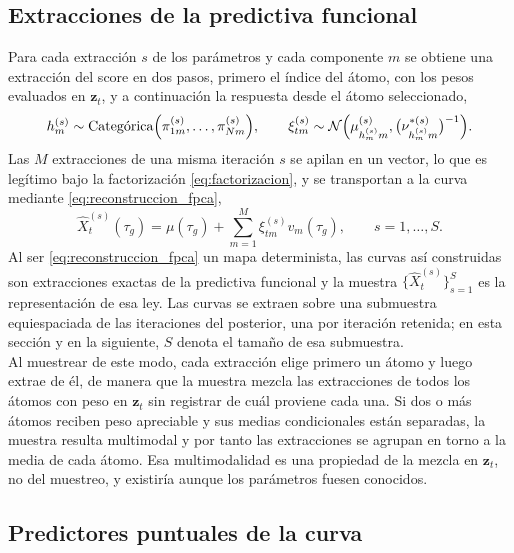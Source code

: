 \subsection{Extracciones de la predictiva funcional}
\label{03_05_03_extracciones}

Para cada extracción $s$ de los parámetros y cada componente $m$ se obtiene una extracción del score en dos pasos, primero el índice del átomo, con los pesos evaluados en $\mathbf{z}_t$, y a continuación la respuesta desde el átomo seleccionado,
\begin{equation}\label{eq:extraccion_score}
    h_m^{(s)} \sim \text{Categórica}\Bigl(\pi_{1m}^{(s)}, \dots, \pi_{Nm}^{(s)}\Bigr),
    \qquad
    \xi_{tm}^{(s)} \sim \mathcal{N}\Bigl(\mu_{h_m^{(s)}m}^{(s)},
    \bigl(\nu_{h_m^{(s)}m}^{*(s)}\bigr)^{-1}\Bigr).
\end{equation}
Las $M$ extracciones de una misma iteración $s$ se apilan en un vector, lo que es legítimo bajo la factorización \eqref{eq:factorizacion}, y se transportan a la curva mediante \eqref{eq:reconstruccion_fpca},
\begin{equation}\label{eq:extraccion_curva}
    \widehat{X}_{t}^{(s)}(\tau_g) = \mu(\tau_g)
    + \sum_{m=1}^{M} \xi_{tm}^{(s)}v_m(\tau_g),
    \qquad s = 1, \dots, S.
\end{equation}
Al ser \eqref{eq:reconstruccion_fpca} un mapa determinista, las curvas así construidas son extracciones exactas de la predictiva funcional y la muestra $\{\widehat{X}_t^{(s)}\}_{s=1}^{S}$ es la representación de esa ley. Las curvas se extraen sobre una submuestra equiespaciada de las iteraciones del posterior, una por iteración retenida; en esta sección y en la siguiente, $S$ denota el tamaño de esa submuestra.\\

Al muestrear de este modo, cada extracción elige primero un átomo y luego extrae de él, de manera que la muestra mezcla las extracciones de todos los átomos con peso en $\mathbf{z}_t$ sin registrar de cuál proviene cada una. Si dos o más átomos reciben peso apreciable y sus medias condicionales están separadas, la muestra resulta multimodal y por tanto las extracciones se agrupan en torno a la media de cada átomo. Esa multimodalidad es una propiedad de la mezcla en $\mathbf{z}_t$, no del muestreo, y existiría aunque los parámetros fuesen conocidos. 

\subsection{Predictores puntuales de la curva}
\label{03_05_04_predictores_puntuales}

